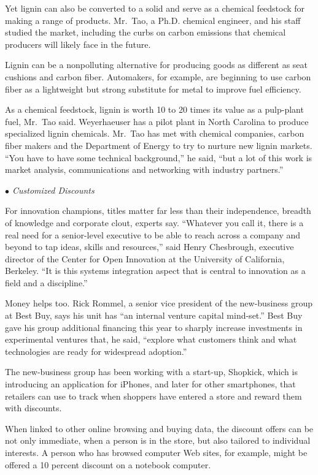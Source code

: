 ﻿\documentclass[12pt]{article}
\begin{document}
Yet lignin can also be converted to a solid and serve as a chemical feedstock for making a range of
products. Mr.~Tao, a Ph.D. chemical engineer, and his staff studied the market, including the curbs
on carbon emissions that chemical producers will likely face in the future.

Lignin can be a nonpolluting alternative for producing goods as different as seat cushions and
carbon fiber. Automakers, for example, are beginning to use carbon fiber as a lightweight but strong
substitute for metal to improve fuel efficiency.

As a chemical feedstock, lignin is worth 10 to 20 times its value as a pulp-plant fuel, Mr.~Tao
said. Weyerhaeuser has a pilot plant in North Carolina to produce specialized lignin chemicals.
Mr.~Tao has met with chemical companies, carbon fiber makers and the Department of Energy to try to
nurture new lignin markets. ``You have to have some technical background,'' he said, ``but a lot of
this work is market analysis, communications and networking with industry partners.''

\emph{$\bullet$ Customized Discounts}

For innovation champions, titles matter far less than their independence, breadth of knowledge and
corporate clout, experts say. ``Whatever you call it, there is a real need for a senior-level
executive to be able to reach across a company and beyond to tap ideas, skills and resources,'' said
Henry Chesbrough, executive director of the Center for Open Innovation at the University of
California, Berkeley. ``It is this systems integration aspect that is central to innovation as a
field and a discipline.''

Money helps too. Rick Rommel, a senior vice president of the new-business group at Best Buy, says
his unit has ``an internal venture capital mind-set.'' Best Buy gave his group additional financing
this year to sharply increase investments in experimental ventures that, he said, ``explore what
customers think and what technologies are ready for widespread adoption.''

The new-business group has been working with a start-up, Shopkick, which is introducing an
application for iPhones, and later for other smartphones, that retailers can use to track when
shoppers have entered a store and reward them with discounts.

When linked to other online browsing and buying data, the discount offers can be not only immediate,
when a person is in the store, but also tailored to individual interests. A person who has browsed
computer Web sites, for example, might be offered a 10 percent discount on a notebook computer.
\end{document}
